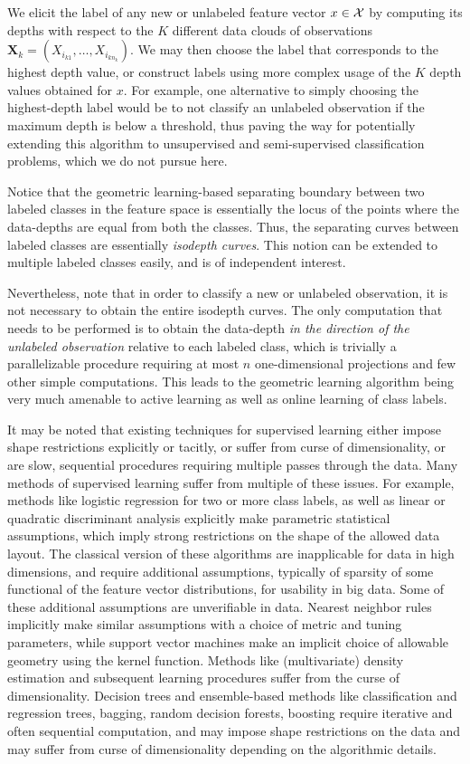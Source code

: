 \documentclass[twoside]{article}
\begin{document}
 We elicit the label of any new or unlabeled feature vector 
$x \in {\cal{X}}$ by computing its depths with respect to the $K$ different 
data clouds of observations $\mathbf{X}_{k} = (X_{i_{k 1}}, \ldots, X_{i_{k n_{k}}})$.
We may then choose the label that corresponds to the highest depth value, or construct
labels using more complex usage of the $K$ depth values obtained for $x$. 
For example, one alternative to simply choosing the highest-depth label would 
be to not classify an unlabeled observation if the maximum depth is below a threshold, 
thus paving the way for potentially extending this algorithm to unsupervised 
and semi-supervised classification problems, which we do not pursue here.

Notice that the geometric learning-based separating boundary between two 
labeled classes in the feature space is essentially the locus of the points where 
the data-depths are equal from both the classes. Thus, the separating curves between 
labeled classes are essentially {\it isodepth curves}. This notion can be extended 
to multiple labeled classes easily, and is of independent interest. 

Nevertheless, note that in order to classify a new or unlabeled observation, it is not 
necessary to obtain the entire isodepth curves. The only computation that needs to 
be performed is to obtain the data-depth {\it in the direction of the unlabeled 
observation} relative to each labeled class, which is  trivially a parallelizable 
procedure requiring at most $n$ one-dimensional projections and few other simple 
computations. This leads to the geometric learning algorithm being very much amenable 
to active learning as well as online learning of class labels. 



It may be noted that existing techniques for supervised learning either impose shape 
restrictions explicitly or tacitly, or suffer from  curse of dimensionality, or are 
slow, sequential procedures requiring multiple passes through the data. 
Many methods of supervised learning suffer from multiple of these issues. 
For example, methods like logistic regression for two or more class labels, as well as 
linear or quadratic 
discriminant analysis explicitly make parametric statistical assumptions, which imply 
strong restrictions on the shape of the allowed data layout. The classical version of 
these algorithms are inapplicable for data in high dimensions, and require additional 
assumptions, typically of sparsity of some functional of the feature vector 
distributions, for usability in big data. Some of these additional assumptions are 
unverifiable in data. Nearest neighbor rules 
implicitly make similar assumptions with a choice of metric and tuning parameters, while 
support vector machines make an implicit choice of allowable geometry using the kernel 
function. Methods like (multivariate) density estimation and subsequent learning 
procedures suffer from the curse of dimensionality. Decision trees and ensemble-based 
methods like classification and regression trees, bagging, random decision forests, 
boosting require iterative and often sequential computation, and may impose shape 
restrictions on the data and may suffer from curse of dimensionality depending on the 
algorithmic details. 
\end{document}
